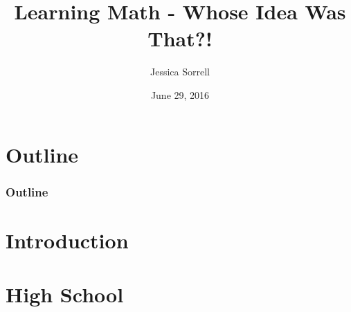 \documentclass{beamer}
\title{Learning Math - Whose Idea Was That?! }
\author{Jessica Sorrell}
\institute{EMC}
\date{June 29, 2016}
\theoremstyle{mystyle}
\begin{document}

\begin{frame}
	\titlepage
\end{frame}

\section*{Outline}

\begin{frame}
	\frametitle{Outline}
	\tableofcontents

\end{frame}

\section{Introduction}
\frame{\tableofcontents[currentsection]}

\begin{frame}

\end{frame}

\section{High School}
\frame{\tableofcontents[currentsection]}
\end{document}
